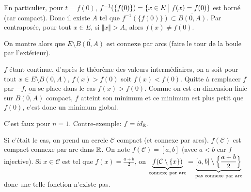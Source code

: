 \begin{solution}
	En particulier, pour $t=f(0)$, $f^{-1}(\{f(0)\})=\{x\in E\bigm| f(x)=f(0)\}$ est borné (car compact). Donc il existe $A$ tel que $f^{-1}(\{f(0)\})\subset\overline{B(0,A)}$. Par contraposée, pour tout $x\in E$, si $\Vert x\Vert>A$, alors $f(x)\neq f(0)$.

	On montre alors que $E\setminus\overline{B(0,A)}$ est connexe par arcs (faire le tour de la boule par l'extérieur).

	$f$ étant continue, d'après le théorème des valeurs intermédiaires, on a soit pour tout $x\in E\setminus\overline{B(0,A)}$, $f(x)>f(0)$ soit $f(x)<f(0)$. Quitte à remplacer $f$ par $-f$, on se place dans le cas $f(x)>f(0)$. Comme on est en dimension finie sur $\overline{B(0,A)}$ compact, $f$ atteint son minimum et ce minimum est plus petit que $f(0)$, c'est donc un minimum global.
\end{solution}

\begin{remark}
	C'est faux pour $n=1$. Contre-exemple: $f=id_{\mathbb{R}}$.
\end{remark}

\begin{solution}
	Si c'était le cas, on prend un cercle $\mathcal{C}$ compact (et connexe par arcs). $f(\mathcal{C})$ est compact connexe par arc dans $\mathbb{R}$. On note $f(\mathcal{C})=[a,b]$ (avec $a<b$ car $f$ injective). Si $x\in\mathcal{C}$ est tel que $f(x)=\frac{a+b}{2}$, on $\underbrace{f(\mathcal{C}\setminus\{x\})}_{\text{connexe par arc}}=\underbrace{[a,b]\setminus\Bigl\{\frac{a+b}{2}\Bigr\}}_{\text{pas connexe par arc}}$ donc une telle fonction n'existe pas.
\end{solution}

